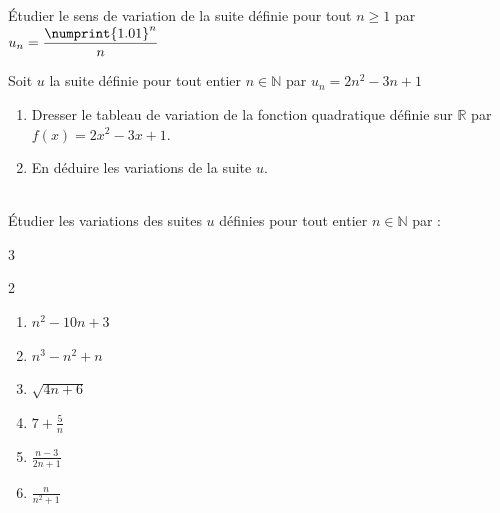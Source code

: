 \documentclass[main.tex]{subfiles}
\begin{document}
\begin{exercise}[entrainement] Étudier le sens de variation de la suite définie pour tout $n\geqslant 1$ par $u_n = \dfrac{\numprint{1.01}^n}{n}$ 
\end{exercise}
\begin{exercise}   Soit $u$ la suite définie pour tout entier $n \in\mathbb{N}$ par $u_n =2n^2-3n+1$
	\begin{enumerate}[label={\arabic*)}, leftmargin=*]
		\item Dresser le tableau de variation de la fonction quadratique définie sur $\mathbb{R}$ par $f(x)=2x^2-3x+1$.
		\item En déduire les variations de la suite $u$.
	\end{enumerate} 
\end{exercise}
\begin{exercise}[suites de la forme $u_n=f(n)$] \hfill \\
Étudier les variations des  suites $u$   définies pour tout entier $n \in\mathbb{N}$ par :
	\begin{multicols}{3}
	\begin{spacing}{2} 
		\begin{enumerate}[label={\arabic*)$u_n=$}, leftmargin=*]
			\item $n^2-10n+3$ 
			\item $n^3-n^2+n$ 
			\item $\sqrt{4n+6}$
			\item $7+\frac{5}{n}$
			\item $ \frac{n-3}{2n+1}$ 
			\item $  \frac{n}{n^2+1}$ 
		\end{enumerate} 
	\end{spacing}
\end{multicols}   
\end{exercise} 
\end{document}

